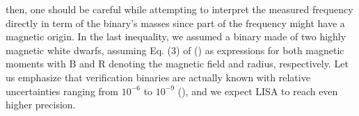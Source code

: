 \documentclass[a4paper,10.5pt]{article}
\begin{document}
then, one should be careful while attempting to interpret the measured frequency directly in term of the binary’s masses since part of the frequency might have a magnetic origin. In the last inequality, we assumed a binary made of two highly magnetic white dwarfs, assuming Eq. (3) of  () as expressions for both magnetic moments with B and R denoting the magnetic field and radius, respectively. Let us emphasize that verification binaries are actually known with relative uncertainties ranging from $10^{-6}$ to $10^{-9}$ (), and we expect LISA to reach even higher precision.


\thispagestyle{empty}
\section{}
\end{document}
